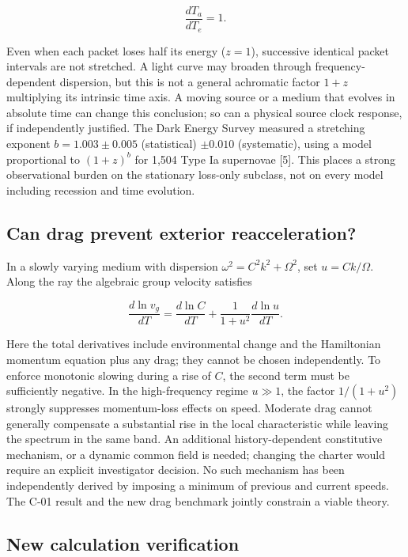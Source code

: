 \documentclass[
  11pt,
  twoside]{article}
\begin{document}
\[\frac{dT_a}{dT_e}=1.\]

Even when each packet loses half its energy (\(z=1\)), successive
identical packet intervals are not stretched. A light curve may broaden
through frequency-dependent dispersion, but this is not a general
achromatic factor \(1+z\) multiplying its intrinsic time axis. A moving
source or a medium that evolves in absolute time can change this
conclusion; so can a physical source clock response, if independently
justified. The Dark Energy Survey measured a stretching exponent
\(b=1.003\pm0.005\) (statistical) \(\pm0.010\) (systematic), using a
model proportional to \((1+z)^b\) for 1,504 Type Ia supernovae {[}5{]}.
This places a strong observational burden on the stationary loss-only
subclass, not on every model including recession and time evolution.

\subsection{Can drag prevent exterior
reacceleration?}\label{can-drag-prevent-exterior-reacceleration}

In a slowly varying medium with dispersion \(\omega^2=C^2k^2+\Omega^2\),
set \(u=Ck/\Omega\). Along the ray the algebraic group velocity
satisfies

\[\frac{d\ln v_g}{dT}=\frac{d\ln C}{dT}+\frac{1}{1+u^2}\frac{d\ln u}{dT}.\]

Here the total derivatives include environmental change and the
Hamiltonian momentum equation plus any drag; they cannot be chosen
independently. To enforce monotonic slowing during a rise of \(C\), the
second term must be sufficiently negative. In the high-frequency regime
\(u\gg1\), the factor \(1/(1+u^2)\) strongly suppresses momentum-loss
effects on speed. Moderate drag cannot generally compensate a
substantial rise in the local characteristic while leaving the spectrum
in the same band. An additional history-dependent constitutive
mechanism, or a dynamic common field is needed; changing the charter
would require an explicit investigator decision. No such mechanism has
been independently derived by imposing a minimum of previous and current
speeds. The C-01 result and the new drag benchmark jointly constrain a
viable theory.

\subsection{New calculation
verification}\label{new-calculation-verification}
\end{document}
